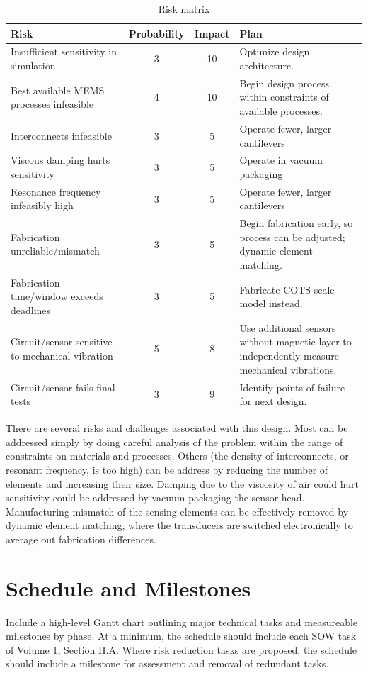 \begin{table}[h!]
\centering
\begin{tabularx}{.85\textwidth}{|X||c|c|X|}
    \hline
    Risk & Probability & Impact & Plan\\
    \hline
    \hline
    Insufficient sensitivity in simulation & 3 & 10 & Optimize design architecture. \\
    \hline
    Best available MEMS processes infeasible & 4 & 10 & Begin design process within constraints of available processes. \\
    \hline
    Interconnects infeasible & 3 & 5 & Operate fewer, larger cantilevers \\
    \hline
    Viscous damping hurts sensitivity & 3 & 5 & Operate in vacuum packaging \\
    \hline
    Resonance frequency infeasibly high & 3  & 5 & Operate fewer, larger cantilevers \\
    \hline
    Fabrication unreliable/mismatch & 3 & 5 & Begin fabrication early, so process can be adjusted; dynamic element matching. \\
    \hline
    Fabrication time/window exceeds deadlines & 3 & 5 & Fabricate COTS scale model instead. \\
    \hline
    Circuit/sensor sensitive to mechanical vibration & 5 & 8 & Use additional sensors without magnetic layer to independently measure mechanical vibrations. \\
    \hline
    Circuit/sensor fails final tests & 3 & 9 & Identify points of failure for next design. \\
    \hline
\end{tabularx}
\caption{Risk matrix}
\label{table:risk}
\end{table}

There are several risks and challenges associated with this design. Most can be addressed simply by doing careful analysis of the problem within the range of constraints on materials and processes. Others (the density of interconnects, or resonant frequency, is too high) can be address by reducing the number of elements and increasing their size. Damping due to the viscosity of air could hurt sensitivity could be addressed by vacuum packaging the sensor head. Manufacturing mismatch of the sensing elements can be effectively removed by dynamic element matching, where the transducers are switched electronically to average out fabrication differences.

\section{Schedule and Milestones}
Include a high-level Gantt chart outlining major technical tasks and measureable milestones
by phase. At a minimum, the schedule should include each SOW task of Volume 1, Section
II.A. Where risk reduction tasks are proposed, the schedule should include a milestone for
assessment and removal of redundant tasks.

